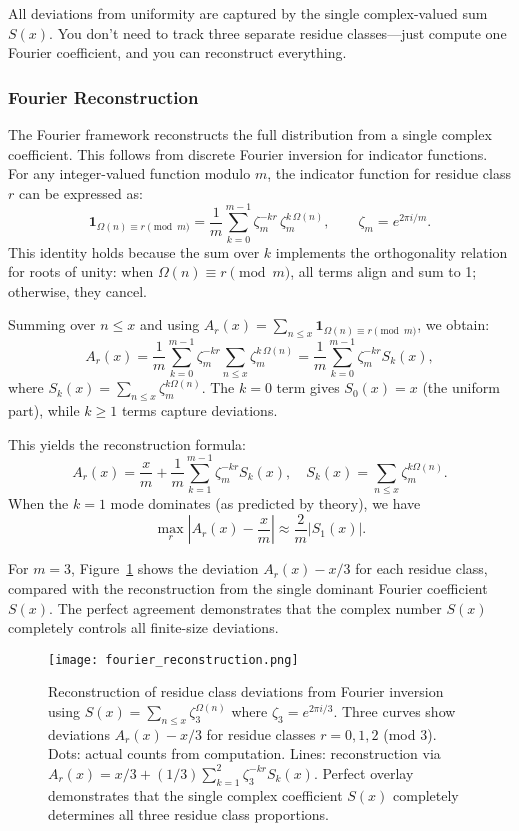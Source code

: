 \documentclass[12pt]{article}
\theoremstyle{definition}
\theoremstyle{remark}
\begin{document}
All deviations from uniformity are captured by the single complex-valued sum $S(x)$. You don't need to track three separate residue classes—just compute one Fourier coefficient, and you can reconstruct everything.

\subsubsection{Fourier Reconstruction}

The Fourier framework reconstructs the full distribution from a single complex coefficient. This follows from discrete Fourier inversion for indicator functions. For any integer-valued function modulo $m$, the indicator function for residue class $r$ can be expressed as:
\[
\mathbf{1}_{\Omega(n) \equiv r \pmod{m}} = \frac{1}{m}\sum_{k=0}^{m-1}\zeta_m^{-kr}\,\zeta_m^{k\,\Omega(n)}, \qquad \zeta_m = e^{2\pi i/m}.
\]
This identity holds because the sum over $k$ implements the orthogonality relation for roots of unity: when $\Omega(n) \equiv r \pmod{m}$, all terms align and sum to 1; otherwise, they cancel.

Summing over $n \leq x$ and using $A_r(x) = \sum_{n \leq x} \mathbf{1}_{\Omega(n) \equiv r \pmod{m}}$, we obtain:
\[
A_r(x) = \frac{1}{m}\sum_{k=0}^{m-1}\zeta_m^{-kr} \sum_{n \leq x}\zeta_m^{k\,\Omega(n)} = \frac{1}{m}\sum_{k=0}^{m-1}\zeta_m^{-kr} S_k(x),
\]
where $S_k(x) = \sum_{n \leq x}\zeta_m^{k\Omega(n)}$. The $k=0$ term gives $S_0(x) = x$ (the uniform part), while $k \geq 1$ terms capture deviations.

This yields the reconstruction formula:
\[
A_r(x) = \frac{x}{m} + \frac{1}{m}\sum_{k=1}^{m-1}\zeta_m^{-kr} S_k(x), \quad S_k(x) = \sum_{n \leq x}\zeta_m^{k\Omega(n)}.
\]
When the $k=1$ mode dominates (as predicted by theory), we have
\[
\max_r \left|A_r(x) - \frac{x}{m}\right| \approx \frac{2}{m}|S_1(x)|.
\]

For $m = 3$, Figure~\ref{fig:fourier_recon} shows the deviation $A_r(x) - x/3$ for each residue class, compared with the reconstruction from the single dominant Fourier coefficient $S(x)$. The perfect agreement demonstrates that the complex number $S(x)$ completely controls all finite-size deviations.

\begin{figure}[ht]
\centering
\texttt{[image: fourier\_reconstruction.png]}
\caption{Reconstruction of residue class deviations from Fourier inversion using $S(x) = \sum_{n \leq x} \zeta_3^{\Omega(n)}$ where $\zeta_3 = e^{2\pi i/3}$. Three curves show deviations $A_r(x) - x/3$ for residue classes $r = 0, 1, 2$ (mod 3). Dots: actual counts from computation. Lines: reconstruction via $A_r(x) = x/3 + (1/3)\sum_{k=1}^2 \zeta_3^{-kr}S_k(x)$. Perfect overlay demonstrates that the single complex coefficient $S(x)$ completely determines all three residue class proportions.}
\label{fig:fourier_recon}
\end{figure}
\end{document}
